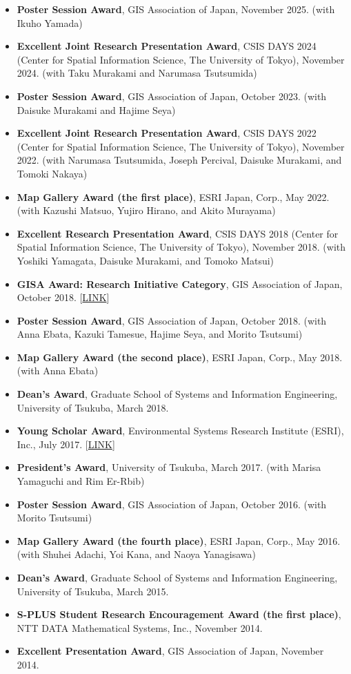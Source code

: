 \documentclass[
]{book}
\providecommand{\tightlist}{%
  \setlength{\itemsep}{0pt}\setlength{\parskip}{0pt}}
\begin{document}
\begin{itemize}
\tightlist
\item
  \textbf{Poster Session Award}, GIS Association of Japan, November 2025.
  (with Ikuho Yamada)
\item
  \textbf{Excellent Joint Research Presentation Award}, CSIS DAYS 2024 (Center for Spatial Information Science, The University of Tokyo), November 2024.
  (with Taku Murakami and Narumasa Tsutsumida)
\item
  \textbf{Poster Session Award}, GIS Association of Japan, October 2023.
  (with Daisuke Murakami and Hajime Seya)
\item
  \textbf{Excellent Joint Research Presentation Award}, CSIS DAYS 2022 (Center for Spatial Information Science, The University of Tokyo), November 2022.
  (with Narumasa Tsutsumida, Joseph Percival, Daisuke Murakami, and Tomoki Nakaya)
\item
  \textbf{Map Gallery Award (the first place)}, ESRI Japan, Corp., May 2022.
  (with Kazushi Matsuo, Yujiro Hirano, and Akito Murayama)
\item
  \textbf{Excellent Research Presentation Award}, CSIS DAYS 2018 (Center for Spatial Information Science, The University of Tokyo), November 2018.
  (with Yoshiki Yamagata, Daisuke Murakami, and Tomoko Matsui)
\item
  \textbf{GISA Award: Research Initiative Category}, GIS Association of Japan, October 2018. {[}\href{https://www.gisa-japan.org/content/files/nl108.pdf}{LINK}{]}
\item
  \textbf{Poster Session Award}, GIS Association of Japan, October 2018.
  (with Anna Ebata, Kazuki Tamesue, Hajime Seya, and Morito Tsutsumi)
\item
  \textbf{Map Gallery Award (the second place)}, ESRI Japan, Corp., May 2018.
  (with Anna Ebata)
\item
  \textbf{Dean's Award}, Graduate School of Systems and Information Engineering, University of Tsukuba, March 2018.
\item
  \textbf{Young Scholar Award}, Environmental Systems Research Institute (ESRI), Inc., July 2017. {[}\href{https://www.esrij.com/cgi-bin/wp/wp-content/uploads/2017/01/YSA-Taiken2017.pdf}{LINK}{]}
\item
  \textbf{President's Award}, University of Tsukuba, March 2017.
  (with Marisa Yamaguchi and Rim Er-Rbib)
\item
  \textbf{Poster Session Award}, GIS Association of Japan, October 2016.
  (with Morito Tsutsumi)
\item
  \textbf{Map Gallery Award (the fourth place)}, ESRI Japan, Corp., May 2016.
  (with Shuhei Adachi, Yoi Kana, and Naoya Yanagisawa)
\item
  \textbf{Dean's Award}, Graduate School of Systems and Information Engineering, University of Tsukuba, March 2015.
\item
  \textbf{S-PLUS Student Research Encouragement Award (the first place)}, NTT DATA Mathematical Systems, Inc., November 2014.
\item
  \textbf{Excellent Presentation Award}, GIS Association of Japan, November 2014.
\end{itemize}
\end{document}
